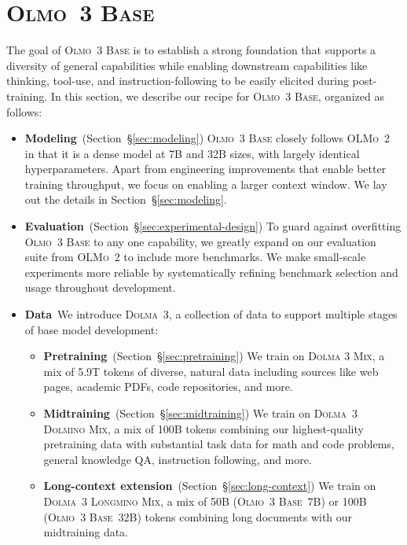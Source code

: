 \documentclass[table]{ai2style/ai2}
\newcommand{\oldOlmo}{OLMo\xspace}
\newcommand{\newOlmo}{Olmo\xspace}
\newcommand{\olmotoo}{\textsc{\oldOlmo~2}\xspace}
\newcommand{\olmothreebase}{\textsc{\newOlmo~3 Base}\xspace}
\newcommand{\dolmatoo}{\textsc{Dolma~3}\xspace}
\newcommand{\dolmatoomix}{\textsc{Dolma 3 Mix}\xspace}
\newcommand{\dolminostoo}{\textsc{Dolma~3 Dolmino Mix}\xspace}
\newcommand{\longminomix}{\textsc{Dolma~3 Longmino Mix}\xspace}
\begin{document}
\section{\olmothreebase}
\label{sec:pretraining-process}

The goal of \olmothreebase is to establish a strong foundation that supports a diversity of general capabilities while enabling downstream capabilities like thinking, tool-use, and instruction-following to be easily elicited during post-training. In this section, we describe our recipe for \olmothreebase, organized as follows:

\begin{itemize}
    \item {\bf{Modeling}}~(Section~\S\ref{sec:modeling}) \olmothreebase closely follows \olmotoo in that it is a dense model at 7B and 32B sizes, with largely identical hyperparameters. Apart from engineering improvements that enable better training throughput, we focus on enabling a larger context window. We lay out the details in Section~\S\ref{sec:modeling}.

    \item {\bf{Evaluation}}~(Section~\S\ref{sec:experimental-design}) To guard against overfitting \olmothreebase to any one capability, we greatly expand on our evaluation suite from \olmotoo to include more benchmarks.
    We make small-scale experiments more reliable by systematically refining benchmark selection and usage throughout development.

    \item {\bf{Data}}~We introduce \dolmatoo, a collection of data to support multiple stages of base model development:
    \begin{itemize}[topsep=0pt,itemsep=2pt,parsep=0pt]
        \item[$\circ$] {\bf{Pretraining}}~(Section~\S\ref{sec:pretraining})
        We train on \dolmatoomix, a mix of 5.9T tokens of diverse, natural data including sources like web pages, academic PDFs, code repositories, and more.

        \item[$\circ$] {\bf{Midtraining}}~(Section~\S\ref{sec:midtraining})
        We train on \dolminostoo, a mix of 100B tokens combining our highest-quality pretraining data with substantial task data for math and code problems, general knowledge QA, instruction following, and more.

        \item[$\circ$] {\bf{Long-context extension}}~(Section~\S\ref{sec:long-context})
        We train on \longminomix, a mix of 50B (\olmothreebase~7B) or 100B (\olmothreebase~32B) tokens combining long documents with our midtraining data.
    \end{itemize}

\end{itemize}
\end{document}

